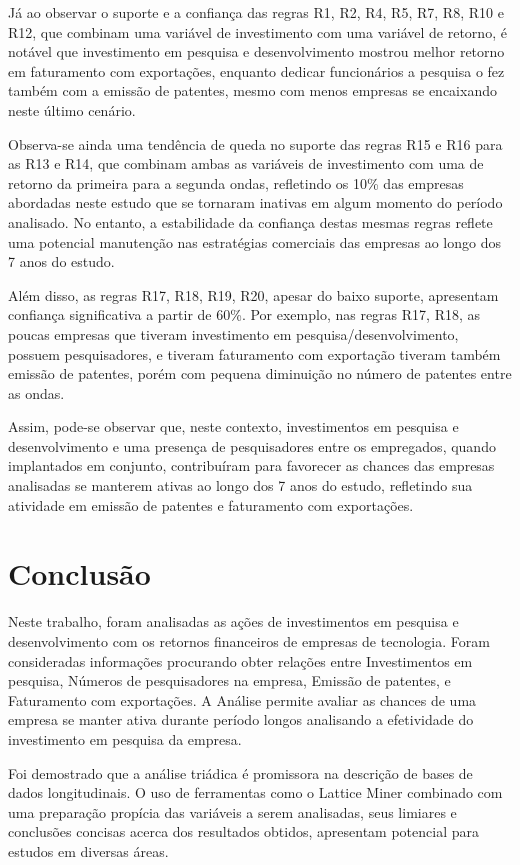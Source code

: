 \documentclass[kdmile,a4paper]{kdmile} %
\begin{document}
Já ao observar o suporte e a confiança das regras R1, R2, R4, R5, R7, R8, R10 e R12, que combinam uma variável de investimento com uma variável de retorno, é notável que investimento em pesquisa e desenvolvimento mostrou melhor retorno em faturamento com exportações, enquanto dedicar funcionários a pesquisa o fez também com a emissão de patentes, mesmo com menos empresas se encaixando neste último cenário.

Observa-se ainda uma tendência de queda no suporte das regras R15 e R16 para as R13 e R14, que combinam ambas as variáveis de investimento com uma de retorno da primeira para a segunda ondas, refletindo os 10\% das empresas abordadas neste estudo que se tornaram inativas em algum momento do período analisado. No entanto, a estabilidade da confiança destas mesmas regras reflete uma potencial manutenção nas estratégias comerciais das empresas ao longo dos 7 anos do estudo.

Além disso, as regras R17, R18, R19, R20, apesar do baixo suporte, apresentam confiança significativa a partir de 60\%. Por exemplo, nas regras R17, R18, as poucas empresas que  tiveram investimento em pesquisa/desenvolvimento, possuem pesquisadores, e tiveram faturamento com exportação tiveram também emissão de patentes, porém com pequena diminuição no número de patentes entre as ondas.

Assim, pode-se observar que, neste contexto, investimentos em pesquisa e desenvolvimento e uma presença de pesquisadores entre os empregados, quando implantados em conjunto, contribuíram para favorecer as chances das empresas analisadas se manterem ativas ao longo dos 7 anos do estudo, refletindo sua atividade em emissão de patentes e faturamento com exportações.

\section{Conclusão}

Neste trabalho, foram analisadas as ações de investimentos em pesquisa e desenvolvimento com os retornos financeiros de empresas de tecnologia. Foram consideradas informações procurando obter relações entre Investimentos em pesquisa, Números de pesquisadores na empresa, Emissão de patentes, e Faturamento com exportações. A Análise permite avaliar as chances de uma empresa se manter ativa durante período longos analisando a efetividade do investimento em pesquisa da empresa.

Foi demostrado que a análise triádica é promissora na descrição de bases de dados longitudinais. O uso de ferramentas como o Lattice Miner combinado com uma preparação propícia das variáveis a serem analisadas, seus limiares e conclusões concisas acerca dos resultados obtidos, apresentam potencial para estudos em diversas áreas.
\end{document}
